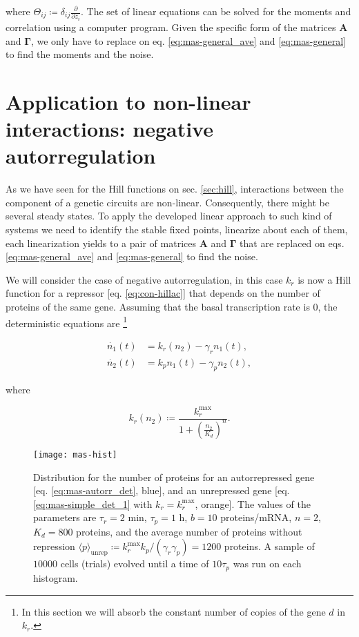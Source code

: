 where $\Theta_{ij} \coloneqq \delta_{ij}\frac{\partial}{\partial z_i}$. The set of linear equations can be solved for the moments and correlation using a computer program. Given the specific form of the matrices $\mathbf{A}$ and $\mathbf{\Gamma}$, we only have to replace on eq. \eqref{eq:mas-general_ave} and \eqref{eq:mas-general} to find the moments and the noise.

\section{Application to non-linear interactions: negative autorregulation}
\label{sec:mas-neg_autorreg}

As we have seen for the Hill functions on sec. \ref{sec:hill}, interactions between the component of a genetic circuits are non-linear. Consequently, there might be several steady states. To apply the developed linear approach to such kind of systems we need to identify the stable fixed points, linearize about each of them, each linearization yields to a pair of matrices $\mathbf{A}$ and $\mathbf{\Gamma}$  that are replaced on eqs. \eqref{eq:mas-general_ave} and \eqref{eq:mas-general} to find the noise.

We will consider the case of negative autorregulation, in this case $k_r$ is now a Hill function for a repressor [eq. \eqref{eq:con-hillac}] that depends on the number of proteins of the same gene. Assuming that the basal transcription rate is $0$, the deterministic equations are \footnote{In this section we will absorb the constant number of copies of the gene $d$ in $k_r$.}

\begin{equation}
  \label{eq:mas-autorr_det}
  \begin{split}
    \dot{n_1}(t) &= k_r(n_2) - \gamma_rn_1(t),\\
    \dot{n_2}(t) &= k_pn_1(t)-\gamma_pn_2(t),
  \end{split}
\end{equation}

where

\begin{equation*}
  k_r(n_2) \coloneqq \frac{k_r^{\text{max}}}{1+\left(\frac{n_2}{K_d}\right)^n}.
\end{equation*}

\begin{figure}[H]
  \centering
  \texttt{[image: mas-hist]}
  \caption[Distribution of proteins for a constitutive gene and a negatively autorregulated gene]{\label{fig:mas-sim_hist}Distribution for the number of proteins for an autorrepressed gene [eq. \eqref{eq:mas-autorr_det}, blue], and an unrepressed gene [eq. \eqref{eq:mas-simple_det_1} with $k_r = k_r^\text{max}$, orange]. The  values of the parameters are $\tau_r=2$ min, $\tau_p=1$ h, $b=10$ proteins/mRNA, $n=2$, $K_d=800$ proteins, and the average number of proteins without repression $\langle p\rangle_\text{unrep} \coloneqq k_r^\text{max}k_p/(\gamma_r\gamma_p) = 1200$ proteins. A sample of $10000$ cells (trials) evolved until a time of $10\tau_p$ was run on each histogram.}
\end{figure}

